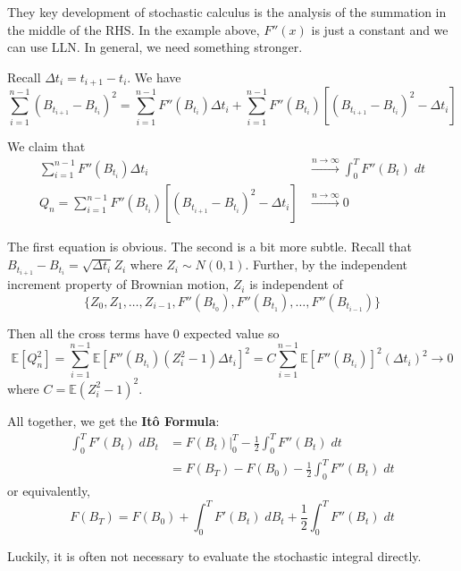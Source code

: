 \documentclass[12pt]{report}
\newcommand{\E}{\mathbb{E}}
\newcommand*{\tbf}[1]{\ifmmode\mathbf{#1}\else\textbf{#1}\fi}
\begin{document}
    They key development of stochastic calculus is the analysis of the summation in the middle of the RHS. In the example above, $F''(x)$ is just a constant and we can use LLN. In general, we need something stronger. 

    Recall $\Delta t_i = t_{i+1} - t_i$. We have 
    \[\sum_{i=1}^{n-1} (B_{t_{i+1}} - B_{t_i})^2 = \sum_{i=1}^{n-1} F''(B_{t_i}) \Delta t_i + \sum_{i=1}^{n-1} F''(B_{t_i}) \left[(B_{t_{i+1}} - B_{t_i})^2 - \Delta t_i\right]\]

    We claim that 
    \begin{align*}
        \sum_{i=1}^{n-1} F''(B_{t_i}) \Delta t_i &\overset{n \to \infty}{\longrightarrow} \int_0^T F''(B_t) \; dt\\ 
        Q_n = \sum_{i=1}^{n-1} F''(B_{t_i}) \left[(B_{t_{i+1}} - B_{t_i})^2 - \Delta t_i\right] &\overset{n \to \infty}{\longrightarrow} 0
    \end{align*}

    The first equation is obvious. The second is a bit more subtle. Recall that $B_{t_{i+1}} - B_{t_i} = \sqrt{\Delta t_i} Z_i$ where $Z_i \sim N(0, 1)$. Further, by the independent increment property of Brownian motion, $Z_i$ is independent of 
    \[\{Z_0, Z_1, \dots, Z_{i-1}, F''(B_{t_0}), F''(B_{t_1}), \dots, F''(B_{t_{i-1}})\}\]

    Then all the cross terms have $0$ expected value so 
    \[\E[Q_n^2] = \sum_{i=1}^{n-1} \E[F''(B_{t_i}) (Z_i^2 - 1)\Delta t_i]^2 = C \sum_{i=1}^{n-1} \E[F''(B_{t_i})]^2 (\Delta t_i)^2 \to 0\]
    where $C = \E(Z_i^2 - 1)^2$. 

    All together, we get the \tbf{Itô Formula}:
    \begin{align*}
        \int_0^T F'(B_t) \; dB_t &= F(B_t)\bigg\vert_0^T - \frac{1}{2}\int_0^T F''(B_t) \; dt\\
        &= F(B_T) - F(B_0) - \frac{1}{2}\int_0^T F''(B_t) \; dt
    \end{align*}
    or equivalently, 
    \[F(B_T) = F(B_0) + \int_0^T F'(B_t) \; dB_t + \frac{1}{2}\int_0^T F''(B_t)\; dt\]

    Luckily, it is often not necessary to evaluate the stochastic integral directly.
\end{document}
